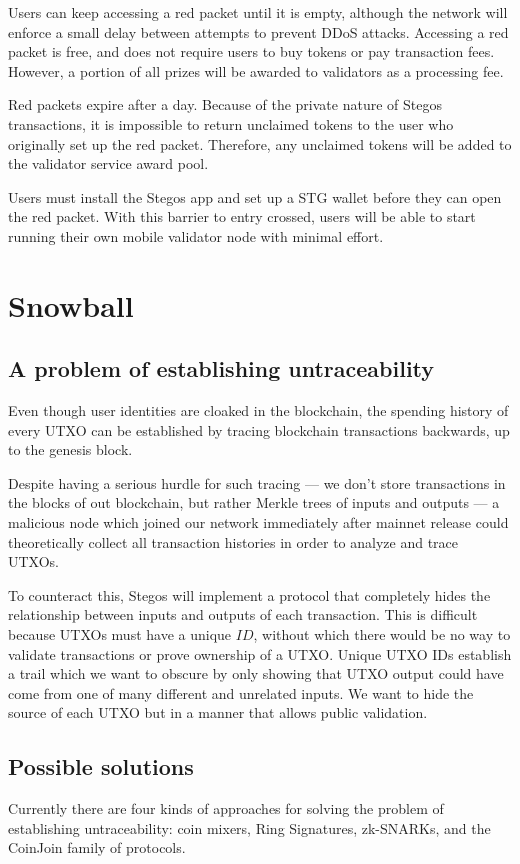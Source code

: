 \documentclass[8pt,fleqn,openany]{book}
\begin{document}
Users can keep accessing a red packet until it is empty, although the network will enforce a small delay between attempts to prevent DDoS attacks. Accessing a red packet is free, and does not require users to buy tokens or pay transaction fees. However, a portion of all prizes will be awarded to validators as a processing fee.

Red packets expire after a day.  Because of the private nature of Stegos transactions, it is impossible to return unclaimed tokens to the user who originally set up the red packet. Therefore, any unclaimed tokens will be added to the validator service award pool.

Users must install the Stegos app and set up a STG wallet before they can open the red packet. With this barrier to entry crossed, users will be able to start running their own mobile validator node with minimal effort.

\section{Snowball}
\subsection{A problem of establishing untraceability}
Even though user identities are cloaked in the blockchain, the spending history of every UTXO can be established by tracing blockchain transactions backwards, up to the genesis block.

Despite having a serious hurdle for such tracing — we don’t store transactions in the blocks of out blockchain, but rather Merkle trees of inputs and outputs — a malicious node which joined our network immediately after mainnet release could theoretically collect all transaction histories in order to analyze and trace UTXOs.

To counteract this, Stegos will implement a protocol that completely hides the relationship between inputs and outputs of each transaction. This is difficult because UTXOs must have a unique $ID$, without which there would be no way to validate transactions or prove ownership of a UTXO. Unique UTXO IDs establish a trail which we want to obscure by only showing that UTXO output could have come from one of many different and unrelated inputs. We want to hide the source of each UTXO but in a manner that allows public validation.

\subsection{Possible solutions}
Currently there are four kinds of approaches for solving the problem of establishing untraceability: coin mixers, Ring Signatures, zk-SNARKs, and the CoinJoin family of protocols.
\end{document}
